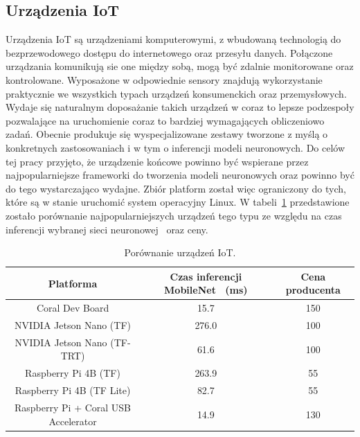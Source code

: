 \subsection{Urządzenia IoT}

Urządzenia IoT są urządzeniami komputerowymi, z wbudowaną technologią do
bezprzewodowego dostępu do internetowego oraz przesyłu danych. Połączone urządzania komunikują
sie one między sobą, mogą być zdalnie monitorowane oraz kontrolowane. Wyposażone w odpowiednie
sensory znajdują wykorzystanie praktycznie we wszystkich typach urządzeń konsumenckich oraz
przemysłowych. Wydaje się naturalnym doposażanie takich urządzeń w coraz to lepsze podzespoły
pozwalające na uruchomienie coraz to bardziej wymagających obliczeniowo zadań. Obecnie produkuje się
wyspecjalizowane zestawy tworzone z myślą o konkretnych zastosowaniach i w tym o inferencji
modeli neuronowych. Do celów tej pracy przyjęto, że urządzenie końcowe powinno być wspierane
przez najpopularniejsze frameworki do tworzenia modeli neuronowych oraz powinno być do tego
wystarczająco wydajne. Zbiór platform został więc ograniczony do tych, które są w stanie
uruchomić system operacyjny Linux. W tabeli~\ref{table:device_comp} przedstawione zostało
porównanie najpopularniejszych urządzeń tego typu ze względu na czas inferencji wybranej sieci
neuronowej~\cite{BoardBenchmark} oraz ceny.

\begin{table}[h]
    \begin{tabular}{ccc}
   Platforma                            & Czas inferencji MobileNet~\cite{MobileNet} (ms) & Cena producenta \\[0.5ex] 
    \hline\hline
    Coral Dev Board                      & \num{15.7}           & \num{150}                  \\
    \hline
    NVIDIA Jetson Nano (TF)              & \num{276.0}          & \num{100}                  \\
    NVIDIA Jetson Nano (TF-TRT)          & \num{61.6}           & \num{100}                  \\
    \hline
    Raspberry Pi 4B (TF)                 & \num{263.9}          & \num{55}                   \\
    Raspberry Pi 4B (TF Lite)            & \num{82.7}           & \num{55}                   \\
    \hline
    Raspberry Pi + Coral USB Accelerator & \num{14.9}           & \num{130}                 
    \end{tabular}
    \caption{Porównanie urządzeń IoT.}
    \label{table:device_comp}
\end{table}


